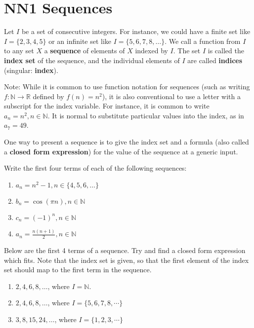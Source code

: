 \section{NN1 Sequences}

\begin{definition}
	Let $I$ be a set of consecutive integers.  For instance, we could have a finite set like $I = \{2,3,4,5\}$ or an infinite set like $I = \{5, 6, 7, 8, \dots\}$.  We call a function from $I$ to any set $X$ a \textbf{sequence} of elements of $X$ indexed by $I$.  The set $I$ is called the \textbf{index set} of the sequence, and the individual elements of $I$ are called \textbf{indices} (singular:  \textbf{index}).
\end{definition}

Note:  While it is common to use function notation for sequences (such as writing $f: \mathbb{N} \to \mathbb{R}$ defined by $f(n) = n^2$), it is also conventional to use a letter with a subscript for the index variable.  For instance, it is common to write $a_n = n^2, n \in \mathbb{N}$.  It is normal to substitute particular values into the index, as in $a_7  =49$.

One way to present a sequence is to give the index set and a formula (also called a \textbf{closed form expression}) for the value of the sequence at a generic input.

\begin{xca}
		Write the first four terms of each of the following sequences:
		
		\begin{enumerate}
				\item $a_n = n^2 -1, n \in \{4,5,6,\dots\}$
				\item $b_n = \cos(\pi n), n \in \mathbb{N}$
				\item $c_n = (-1)^n, n \in \mathbb{N}$
				\item $a_n = \frac{n(n+1)}{2}, n \in \mathbb{N}$
			\end{enumerate}
	\end{xca}

\begin{xca}
	Below are the first 4 terms of a sequence.  Try and find a closed form expression which fits.  Note that the index set is given, so that the first element of the index set should map to the first term in the sequence.
	
	\begin{enumerate}
		\item $2, 4, 6, 8, \dots$, where  $I = \mathbb{N}$.
		\item $2, 4, 6, 8, \dots$,  where $I = \{5, 6, 7, 8, \cdots\}$
		\item $3, 8, 15, 24, \dots$, where $I = \{1,2,3, \cdots\}$
	\end{enumerate}
\end{xca}

